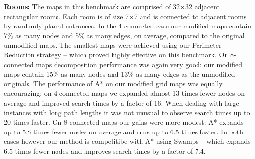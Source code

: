 \textbf{Rooms:}
The maps in this benchmark are comprised of 32$\times$32 adjacent rectangular rooms. Each room is of size 7$\times$7
and is connected to adjacent rooms by randomly placed entrances.
In the 4-connected case our modified maps contain 7\% as many nodes and 5\% as many
edges, on average, compared to the original unmodified maps.
The smallest maps were achieved using our Perimeter Reduction strategy -- which proved highly effective on this
benchmark.
On 8-connected maps decomposition performance was again very good: our modified maps contain 15\% as many nodes and 13\% as 
many edges as the unmodified originals.
The performance of A* on our modified grid maps was equally encouraging: 
on 4-connected maps we expanded almost 13 times fewer nodes on average and improved search times by a factor of 16.
When dealing with large instances with long path lengths it was not unusual to observe search times up to 20 times
faster.
On 8-connected maps our gains were more modest: A* expands up to 5.8 times fewer nodes on average and runs
up to 6.5 times faster. 
In both cases however our method is competitibe with A* using Swamps -- which expands 6.5 times fewer nodes and improves search 
times by a factor of 7.4.






